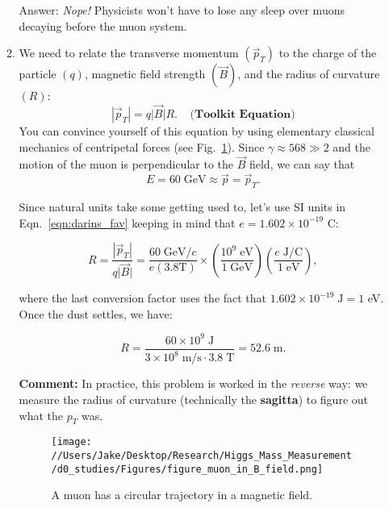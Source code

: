 \documentclass[11pt]{article}
\begin{document}
\begin{enumerate}
\begin{enumerate}
        Answer: \emph{Nope!} Physicists won't have to lose any sleep over 
        muons decaying before the muon system.

        \item We need to relate the transverse momentum $(\vec{p}_{T})$ to the 
        charge of the particle $(q)$, magnetic field strength 
        $(\vec{B})$, and the
        radius of curvature $(R)$:
        \begin{equation}
            \label{eqn:darins_fav}
            \left| \vec{p}_{T} \right| = q \lvert \vec{B} \rvert R.
            \;\;\;\; \textbf{(Toolkit Equation)}
        \end{equation}
        You can convince yourself of this equation by using elementary classical mechanics
        of centripetal forces (see Fig.~\ref{fig:circular_motion}).
        Since $\gamma \approx 568 \gg 2$ and the motion of the muon is perpendicular to the $\vec{B}$ field, 
        we can say that 
        $$E = 60 \mathrm{\;GeV} \approx \vec{p} = \vec{p}_{T}.$$
        
        Since natural units take some getting used to, 
        let's use SI units in Eqn.~\ref{eqn:darins_fav} keeping in mind that
        $e = 1.602 \times 10^{-19}$ C:

        \begin{equation*}
            R = \frac{\left| \vec{p}_{T} \right|}{q \lvert \vec{B} \rvert} 
            = \frac{60 \mathrm{\;GeV}/c}{e (3.8 \mathrm{T})} \times
            \left( \frac{10^{9} \mathrm{\;eV}}{1 \mathrm{\;GeV}} \right)
            \left( \frac{e \mathrm{\;J/C}}{1 \mathrm{\;eV}} \right),
        \end{equation*}

        where the last conversion factor uses the fact that 
        $1.602 \times 10^{-19} \mathrm{\;J} = 1$ eV.
        Once the dust settles, we have:

        \begin{equation*}
            R = \frac{60 \times 10^{9} \mathrm{\;J}}
            {3 \times 10^{8} \mathrm{\;m/s}\cdot 3.8 \mathrm{\;T}} = 52.6 \mathrm{\;m}.
        \end{equation*}

        {\centering \textbf{Comment:} 
        In practice, this problem is worked in the \textit{reverse} way: 
        we measure the radius of curvature (technically the \textbf{sagitta})
        to figure out what the $p_{T}$ was.
        }
        \begin{figure}[bhtp]
            \centering
            \texttt{[image: //Users/Jake/Desktop/Research/Higgs\_Mass\_Measurement/d0\_studies/Figures/figure\_muon\_in\_B\_field.png]}
                \caption{A muon has a circular trajectory in a magnetic field.} 
            \label{fig:circular_motion}
            \end{figure}


\end{enumerate}
\end{enumerate}
\end{document}
